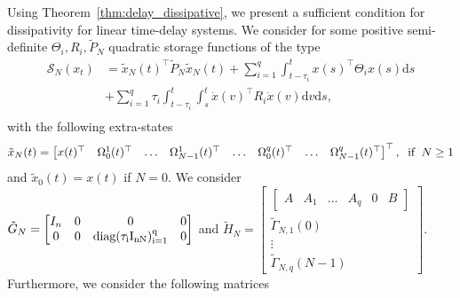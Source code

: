 \documentclass[12pt]{article}
\begin{document}
Using Theorem~\ref{thm:delay_dissipative}, we present a sufficient condition for dissipativity for linear time-delay systems. We consider for some positive semi-definite $\Theta_i,R_i,\tilde P_N$ quadratic storage functions of the type 
\begin{align}\label{eq:storage_fixed_delay_linear}
\mathcal{S}_{N}(x_t)&=\tilde{x}_N(t)^\top \tilde P_N \tilde{x}_N(t)+\sum_{i=1}^q \int_{t-\tau_i}^t x(s)^\top \Theta_i x(s)\mathrm{d}s\\
&+ \sum_{i=1}^q \tau_i \int_{t-\tau_i}^t\int_s^t\dot x(v)^\top R_i \dot x(v)\mathrm{d}v\mathrm{d}s,\\\nonumber
\end{align} 
with the following extra-states 
{\footnotesize \begin{equation*}
\tilde {x}_{N}(t) = \begin{bmatrix} 
x(t)^\top &
\Omega_0^{1}(t)^\top  & 
\ldots &\Omega_{N-1}^{1}(t)^\top &
\ldots&
\Omega_{0}^{q}(t)^\top & \ldots &  \Omega_{N-1}^{q}(t)^\top 
\end{bmatrix}^\top , \hspace{2mm} \text{if} \hspace{2mm} N \geq 1
\end{equation*} }
and $\tilde{x}_0(t)=x(t)$ if $N=0.$
We consider 
\vspace{4mm}\\
$\tilde{G}_{N}=\begin{bmatrix}
I_n & 0&0&0 \\
   0& 0  & \rm diag(\tau_i I_{nN})_{i=1}^q & 0 \end{bmatrix}$ and
$\tilde{H}_{N}=\begin{bmatrix}
       \begin{bmatrix} A  & A_1 &  \ldots&  A_q &      0 & B \end{bmatrix} \\
       \tilde \Gamma_{N,1}(0) \\ \vdots \\ \tilde \Gamma_{N,q}(N-1) \end{bmatrix}. $
       \vspace{4mm}\\
Furthermore, we consider the following matrices
\end{document}

